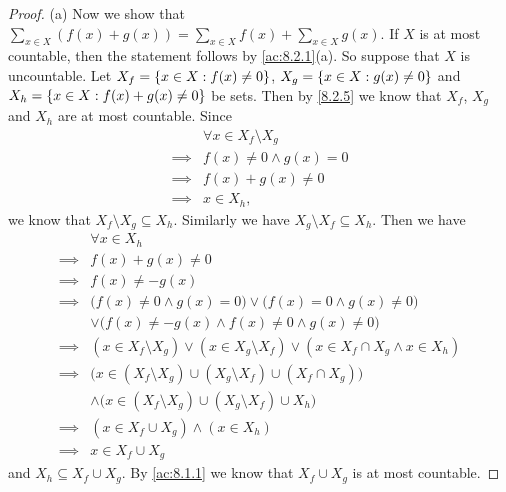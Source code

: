 \begin{proof}{(a)}
  Now we show that \(\sum_{x \in X} (f(x) + g(x)) = \sum_{x \in X} f(x) + \sum_{x \in X} g(x)\).
  If \(X\) is at most countable, then the statement follows by \cref{ac:8.2.1}(a).
  So suppose that \(X\) is uncountable.
  Let \(X_f = \left\lbrace x \in X : f(x) \neq 0\right\rbrace\), \(X_g = \left\lbrace x \in X : g(x) \neq 0\right\rbrace\) and \(X_h = \left\lbrace x \in X : f(x) + g(x) \neq 0\right\rbrace\) be sets.
  Then by \cref{8.2.5} we know that \(X_f\), \(X_g\) and \(X_h\) are at most countable.
  Since
  \begin{align*}
             & \forall x \in X_f \setminus X_g \\
    \implies & f(x) \neq 0 \land g(x) = 0      \\
    \implies & f(x) + g(x) \neq 0              \\
    \implies & x \in X_h,
  \end{align*}
  we know that \(X_f \setminus X_g \subseteq X_h\).
  Similarly we have \(X_g \setminus X_f \subseteq X_h\).
  Then we have
  \begin{align*}
             & \forall x \in X_h                                                                                  \\
    \implies & f(x) + g(x) \neq 0                                                                                 \\
    \implies & f(x) \neq -g(x)                                                                                    \\
    \implies & \big(f(x) \neq 0 \land g(x) = 0\big) \lor \big(f(x) = 0 \land g(x) \neq 0\big)                     \\
             & \lor \big(f(x) \neq -g(x) \land f(x) \neq 0 \land g(x) \neq 0\big)                                 \\
    \implies & (x \in X_f \setminus X_g) \lor (x \in X_g \setminus X_f) \lor (x \in X_f \cap X_g \land x \in X_h) \\
    \implies & \big(x \in (X_f \setminus X_g) \cup (X_g \setminus X_f) \cup (X_f \cap X_g)\big)                   \\
             & \land \big(x \in (X_f \setminus X_g) \cup (X_g \setminus X_f) \cup X_h\big)                        \\
    \implies & (x \in X_f \cup X_g) \land (x \in X_h)                                                             \\
    \implies & x \in X_f \cup X_g
  \end{align*}
  and \(X_h \subseteq X_f \cup X_g\).
  By \cref{ac:8.1.1} we know that \(X_f \cup X_g\) is at most countable.

\end{proof}
